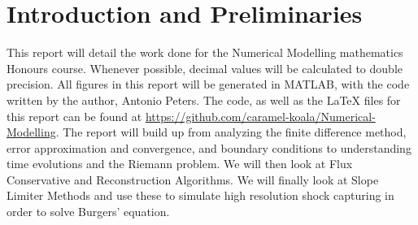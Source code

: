 \chapter{Introduction and Preliminaries}
This report will detail the work done for the Numerical Modelling mathematics Honours course. Whenever possible, decimal values will be calculated to double precision. All figures in this report will be generated in MATLAB, with the code written by the author, Antonio Peters. The code, as well as the LaTeX files for this report can be found at \url{https://github.com/caramel-koala/Numerical-Modelling}. The report will build up from analyzing the finite difference method, error approximation and convergence, and boundary conditions to understanding time evolutions and the Riemann problem. We will then look at Flux Conservative and Reconstruction Algorithms. We will finally look at Slope Limiter Methods and use these to simulate high resolution shock capturing in order to solve Burgers' equation.